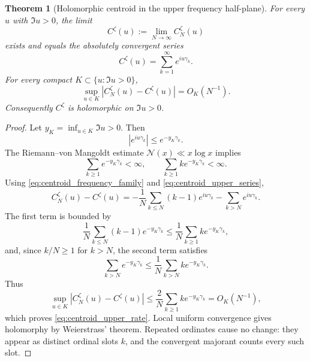 \documentclass[11pt]{amsart}
\numberwithin{equation}{section}
\newtheorem{theorem}{Theorem}[section]
\theoremstyle{definition}
\theoremstyle{remark}
\begin{document}
\begin{theorem}[Holomorphic centroid in the upper frequency half-plane]\label{thm:holomorphic_centroid}
For every $u$ with $\Im u>0$, the limit
\begin{equation}\label{eq:centroid_upper_limit}
C^{\zeta}(u):=\lim_{N\to\infty}C_N^{\zeta}(u)
\end{equation}
exists and equals the absolutely convergent series
\begin{equation}\label{eq:centroid_upper_series}
\boxed{C^{\zeta}(u)=\sum_{k=1}^{\infty}e^{iu\gamma_k}.}
\end{equation}
For every compact $K\subset\{u:\Im u>0\}$,
\begin{equation}\label{eq:centroid_upper_rate}
\sup_{u\in K}|C_N^{\zeta}(u)-C^{\zeta}(u)|=O_K(N^{-1}).
\end{equation}
Consequently $C^{\zeta}$ is holomorphic on $\Im u>0$.
\end{theorem}

\begin{proof}
Let $y_K=\inf_{u\in K}\Im u>0$. Then
\begin{equation}\label{eq:centroid_phase_decay}
|e^{iu\gamma_k}|\le e^{-y_K\gamma_k}.
\end{equation}
The Riemann--von Mangoldt estimate $\mathcal N(x)\ll x\log x$ implies
\begin{equation}\label{eq:centroid_exp_moments}
\sum_{k\ge1}e^{-y_K\gamma_k}<\infty,
\qquad
\sum_{k\ge1}k e^{-y_K\gamma_k}<\infty.
\end{equation}
Using \eqref{eq:centroid_frequency_family} and \eqref{eq:centroid_upper_series},
\begin{equation}\label{eq:centroid_upper_difference}
C_N^{\zeta}(u)-C^{\zeta}(u)
=-\frac1N\sum_{k\le N}(k-1)e^{iu\gamma_k}
-\sum_{k>N}e^{iu\gamma_k}.
\end{equation}
The first term is bounded by
\[
\frac1N\sum_{k\le N}(k-1)e^{-y_K\gamma_k}
\le \frac1N\sum_{k\ge1}k e^{-y_K\gamma_k},
\]
and, since \(k/N\ge1\) for \(k>N\), the second term satisfies
\[
\sum_{k>N}e^{-y_K\gamma_k}
\le \frac1N\sum_{k>N}k e^{-y_K\gamma_k}.
\]
Thus
\[
\sup_{u\in K}|C_N^{\zeta}(u)-C^{\zeta}(u)|
\le \frac{2}{N}\sum_{k\ge1}k e^{-y_K\gamma_k}=O_K(N^{-1}),
\]
which proves \eqref{eq:centroid_upper_rate}. Local uniform convergence gives holomorphy by Weierstrass' theorem. Repeated ordinates cause no change: they appear as distinct ordinal slots \(k\), and the convergent majorant counts every such slot.
\end{proof}
\end{document}
